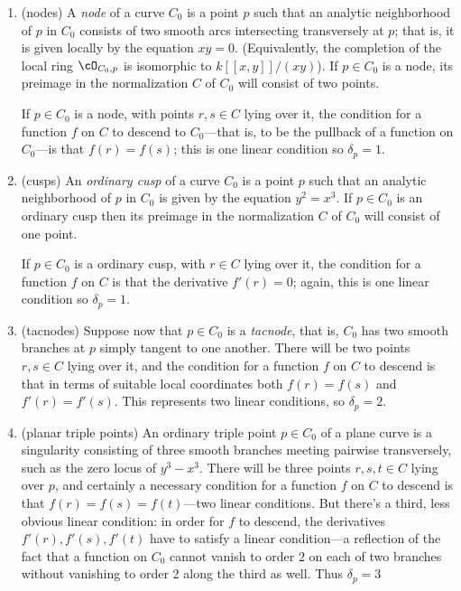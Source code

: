 \begin{enumerate}

\item (nodes) A \emph{node} of a curve $C_0$ is a point $p$ such that an analytic neighborhood of $p$ in $C_0$ consists of two smooth arcs intersecting transversely at $p$; that is, it is given locally by the equation $xy=0$. (Equivalently, the completion of the local ring $\cO_{C_0,p}$ is isomorphic to $k[[x,y]]/(xy)$). If $p \in C_0$ is a node, its preimage in the normalization $C$ of $C_0$ will consist of two points.

If $p \in C_0$ is a node, with points $r,s \in C$ lying over it, the condition for a function $f$ on $C$ to descend to $C_0$---that is, to be the pullback of a function
on $C_0$---is  that $f(r)=f(s)$; this is one linear condition so $\delta_p = 1$.

\item (cusps) An \emph{ordinary cusp} of a curve $C_0$ is a point $p$ such that an analytic neighborhood of $p$ in $C_0$ is given by the equation $y^2=x^3$. If $p \in C_0$ is an ordinary cusp then its preimage in the normalization $C$ of $C_0$ will consist of one point.

If $p \in C_0$ is a ordinary cusp, with  $r \in C$ lying over it, the condition for a function $f$ on $C$  is that the derivative $f'(r)=0$; again, this is one linear condition so $\delta_p = 1$.

\item (tacnodes) Suppose now that $p \in C_0$ is a \emph{tacnode}, that is, $C_0$ has two smooth branches at $p$ simply tangent to one another. There will be two points $r, s \in C$ lying over it, and the condition for a function $f$ on $C$ to descend is that in terms of suitable local coordinates both $f(r)=f(s)$ and $f'(r)=f'(s)$.  This represents two linear conditions, so $\delta_p = 2$.

\item (planar triple points) An ordinary triple point $p \in C_0$ of a plane curve is a singularity consisting of three smooth branches meeting pairwise transversely, such as the zero locus of $y^3-x^3$. There will be three points $r,s,t \in C$ lying over $p$, and certainly a necessary condition for a function $f$ on $C$ to descend is that $f(r)=f(s)=f(t)$---two linear conditions. But there's a third, less obvious linear condition: in order for $f$ to descend, the derivatives $f'(r), f'(s), f'(t)$ have to satisfy a linear condition---a reflection of the fact that a function on $C_0$ cannot vanish to order 2 on each of two branches without vanishing to order 2 along the third as well. Thus $\delta_p = 3$


\end{enumerate}
